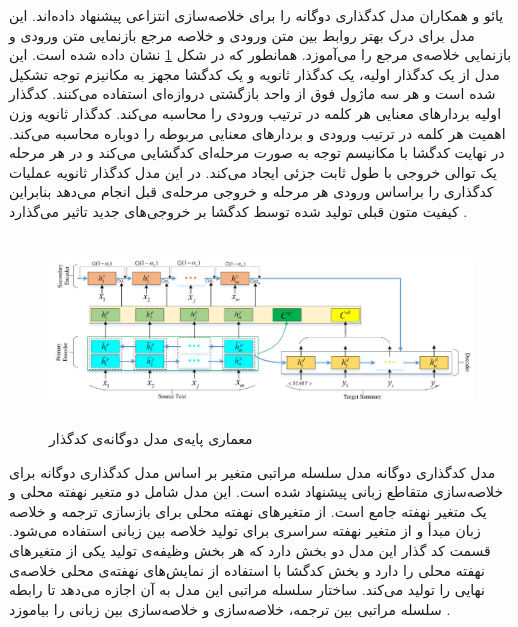 یائو
و همکاران مدل کدگذاری دوگانه را برای خلاصه‌سازی انتزاعی پیشنهاد داده‌اند. این مدل برای درک بهتر روابط بین متن ورودی و خلاصه مرجع بازنمایی متن ورودی و بازنمایی خلاصه‌ی مرجع را می‌آموزد. همانطور که در شکل \ref{fig:dual_encoder} نشان داده شده است.
این مدل از یک کدگذار اولیه، یک کدگذار ثانویه و یک کدگشا مجهز به مکانیزم توجه تشکیل شده است و هر سه ماژول فوق از واحد بازگشتی دروازه‌ای
استفاده می‌کنند. 
کدگذار اولیه بردارهای معنایی هر کلمه در ترتیب ورودی را محاسبه می‌کند. کدگذار ثانویه وزن اهمیت هر کلمه در ترتیب ورودی و بردارهای معنایی مربوطه را دوباره محاسبه می‌کند. در نهایت کدگشا با مکانیسم توجه به صورت مرحله‌ای کدگشایی می‌کند و در هر مرحله یک توالی خروجی با طول ثابت جزئی ایجاد می‌کند. در این مدل کدگذار ثانویه عملیات کدگذاری را براساس ورودی هر مرحله و خروجی مرحله‌ی قبل انجام می‌دهد بنابراین کیفیت متون قبلی تولید شده توسط کدگشا بر خروجی‌های جدید تاثیر می‌گذارد
\cite{yao2018dual}.



\begin{figure}[!h]
	\begin{center}
		\includegraphics[height=5cm]{dualـencoder.png}
	\end{center}
	\caption{معماری پایه‌‌ی مدل دوگانه‌ی کدگذار 	 \cite{yao2018dual}}
	\label{fig:dual_encoder}
	\medskip
	\small
\end{figure}


مدل کدگذاری دوگانه مدل سلسله مراتبی متغیر بر اساس مدل کدگذاری دوگانه برای خلاصه‌سازی متقاطع زبانی
پیشنهاد شده است. این مدل شامل دو متغیر نهفته محلی و یک متغیر نهفته جامع است. از متغیرهای نهفته محلی برای بازسازی ترجمه و خلاصه زبان مبدأ و از متغیر نهفته سراسری برای تولید خلاصه بین زبانی استفاده می‌شود. قسمت کد گذار این مدل دو بخش دارد که هر بخش وظیفه‌ی تولید یکی از متغیرهای نهفته محلی را دارد و بخش کدگشا با استفاده از نمایش‌های نهفته‌ی محلی خلاصه‌ی نهایی را تولید می‌کند.
ساختار سلسله مراتبی این مدل به آن اجازه می‌دهد تا رابطه سلسله مراتبی بین ترجمه، خلاصه‌سازی و خلاصه‌سازی بین زبانی را بیاموزد \cite{variational}.

